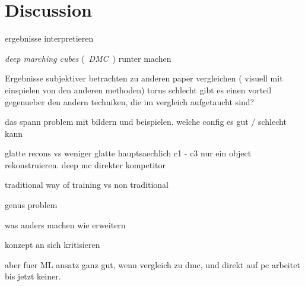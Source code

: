 \chapter{Discussion}
\label{sec:dicussion}
ergebnisse interpretieren

\emph{deep marching cubes} (~\emph{DMC}~) runter machen

Ergebnisse subjektiver betrachten
zu anderen paper vergleichen ( visuell mit einspielen von den anderen methoden)
torus schlecht
gibt es einen vorteil gegenueber den andern techniken, die im vergleich aufgetaucht sind?

das spann problem mit bildern und beispielen. welche config es gut / schlecht kann

glatte recons vs weniger glatte hauptsaechlich c1 - c3
nur ein object rekonstruieren.
deep mc direkter kompetitor

traditional way of training vs non traditional

genus problem

was anders machen
wie erweitern

konzept an sich kritisieren

aber fuer ML ansatz ganz gut, wenn vergleich zu dmc, und 
direkt auf pc arbeitet bis jetzt keiner.
